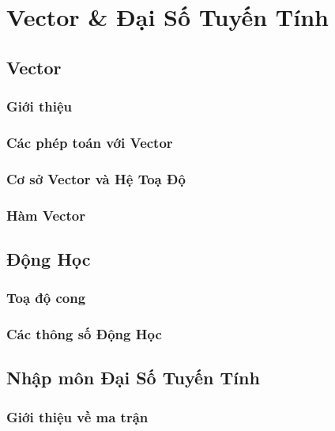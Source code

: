   
\chapter{Vector \& Đại Số Tuyến Tính}


\section{Vector}
\subsection{Giới thiệu}
\subsection{Các phép toán với Vector}
\subsection{Cơ sở Vector và Hệ Toạ Độ}
\subsection{Hàm Vector}

\section{Động Học}
\subsection{Toạ độ cong}
\subsection{Các thông số Động Học}

\section{Nhập môn Đại Số Tuyến Tính}
\subsection{Giới thiệu về ma trận}



\begin{refsection}
\nocite{linear123, extrabook}
\printbibliography
\end{refsection}